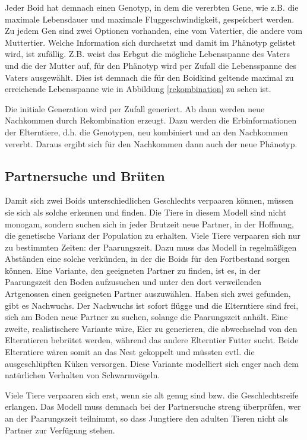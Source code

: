\documentclass[draft=false
              ,paper=a4
              ,twoside=false
              ,fontsize=11pt
              ,headsepline
              ,BCOR10mm
              ,DIV11
              ,bibtotoc
              ,liststotoc
              ]{scrbook}
\begin{document}
Jeder Boid hat demnach einen Genotyp, in dem die vererbten Gene, wie z.B. die maximale Lebensdauer und maximale Fluggeschwindigkeit, gespeichert werden. Zu jedem Gen sind zwei Optionen vorhanden, eine vom Vatertier, die andere vom Muttertier. Welche Information sich durchsetzt und damit im Phänotyp gelistet wird, ist zufällig. Z.B. weist das Erbgut die mögliche Lebensspanne des Vaters und die der Mutter auf, für den Phänotyp wird per Zufall die Lebensspanne des Vaters ausgewählt. Dies ist demnach die für den Boidkind geltende maximal zu erreichende Lebensspanne wie in Abbildung \ref{rekombination} zu sehen ist.

Die initiale Generation wird per Zufall generiert. Ab dann werden neue Nachkommen durch Rekombination erzeugt. Dazu werden die Erbinformationen der Elterntiere, d.h. die Genotypen, neu kombiniert und an den Nachkommen vererbt. Daraus ergibt sich für den Nachkommen dann auch der neue Phänotyp.

\subsection{Partnersuche und Brüten}
Damit sich zwei Boids unterschiedlichen Geschlechts verpaaren können, müssen sie sich als solche erkennen und finden. Die Tiere in diesem Modell sind nicht monogam, sondern suchen sich in jeder Brutzeit neue Partner, in der Hoffnung, die genetische Varianz der Population zu erhalten.
Viele Tiere verpaaren sich nur zu bestimmten Zeiten: der Paarungszeit. Dazu muss das Modell in regelmäßigen Abständen eine solche verkünden, in der die Boids für den Fortbestand sorgen können.
Eine Variante, den geeigneten Partner zu finden, ist es, in der Paarungszeit den Boden aufzusuchen und unter den dort verweilenden Artgenossen einen geeigneten Partner auszuwählen. Haben sich zwei gefunden, gibt es Nachwuchs. Der Nachwuchs ist sofort flügge und die Elterntiere sind frei, sich am Boden neue Partner zu suchen, solange die Paarungszeit anhält.
Eine zweite, realistischere Variante wäre, Eier zu generieren, die abwechselnd von den Elterntieren bebrütet werden, während das andere Elterntier Futter sucht. Beide Elterntiere wären somit an das Nest gekoppelt und müssten evtl. die ausgeschlüpften Küken versorgen. Diese Variante modelliert sich enger nach dem natürlichen Verhalten von Schwarmvögeln.

Viele Tiere verpaaren sich erst, wenn sie alt genug sind bzw. die Geschlechtsreife erlangen. Das Modell muss demnach bei der Partnersuche streng überprüfen, wer an der Paarungszeit teilnimmt, so dass Jungtiere den adulten Tieren nicht als Partner zur Verfügung stehen.
\end{document}
